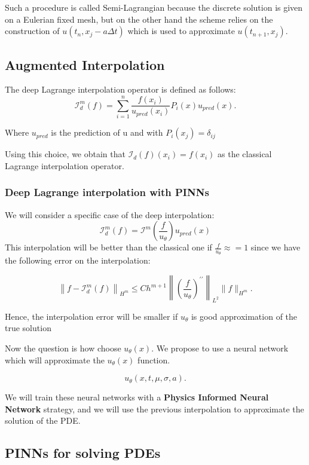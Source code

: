 \documentclass{article}
\begin{document}
Such a procedure is called Semi-Lagrangian because the discrete solution is given on a Eulerian fixed mesh, but on the other hand the scheme relies on the construction of $u\left(t_n, x_j-a \Delta t\right)$ which is used to approximate  $u\left(t_{n+1}, x_j\right)$.

\subsection{Augmented Interpolation}

The deep Lagrange interpolation operator is defined as follows:
\begin{equation*}
    \mathcal{I}_d^m(f)=\sum_{i=1}^n \frac{f\left(x_i\right)}{u_{pred}\left(x_i\right)} P_i(x) u_{pred}(x).
\end{equation*}

Where $u_{pred}$ is the prediction of u and with $P_i\left(x_j\right)=\delta_{i j}$

Using this choice, we obtain that $\mathcal{I}_d(f)\left(x_i\right)=f\left(x_i\right)$ as the classical Lagrange interpolation operator. 

\subsubsection{Deep Lagrange interpolation with PINNs}

We will consider a specific case of the deep interpolation:
$$
\mathcal{I}_d^m(f)=\mathcal{I}^m\left(\frac{f}{u_\theta}\right) u_{pred}(x)
$$
This interpolation will be better than the classical one if $\frac{f}{u_\theta} \approx=1$ since we have the following error on the interpolation:

$$
\left\|f-\mathcal{I}_d^m(f)\right\|_{H^m} \leq C h^{m+1}\left\|\left(\frac{f}{u_\theta}\right)^{\prime \prime}\right\|_{L^2}\|f\|_{H^m}.
$$

Hence, the interpolation error will be smaller if $u_\theta$ is good approximation of the true solution

Now the question is how choose $u_\theta(x)$. We propose to use a neural network which will approximate the $u_\theta(x)$ function. 

$$
u_\theta (x ,t, \mu, \sigma, a).
$$

We will train these neural networks with a \textbf{Physics Informed Neural Network} strategy, and we will use the previous interpolation to approximate the solution of the PDE.
\subsection{PINNs for solving PDEs} 
\end{document}
